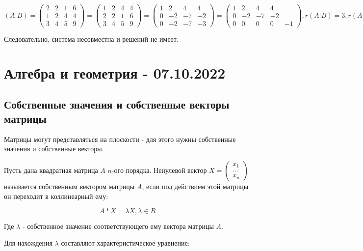 \documentclass{article}
\begin{document}
$(A|B) = \begin{pmatrix}
    2 & 2 & 1 & 6 \\
    1 & 2 & 4 & 4 \\
    3 & 4 & 5 & 9
\end{pmatrix} = \begin{pmatrix}
    1 & 2 & 4 & 4 \\
    2 & 2 & 1 & 6 \\
    3 & 4 & 5 & 9
\end{pmatrix} = \begin{pmatrix}
    1 & 2 & 4 & 4 \\
    0 & -2 & -7 & -2 \\
    0 & -2 & -7 & -3
\end{pmatrix} = \begin{pmatrix}
    1 & 2 & 4 & 4 \\
    0 & -2 & -7 & -2 \\
    0 & 0 & 0 & 0 & -1
\end{pmatrix}, r(A|B) = 3, r(A) = 2$

Следовательно, система несовместна и решений не имеет.

\pagebreak
\section{Алгебра и геометрия - 07.10.2022}

\subsection{Собственные значения и собственные векторы матрицы}

Матрицы могут представляться на плоскости - для этого нужны собственные значения и собственные векторы.

Пусть дана квадратная матрица $A$ $n$-ого порядка. Ненулевой вектор $X = \begin{pmatrix}
    x_1 \\
    ... \\
    x_n
\end{pmatrix}$ называется собственным вектором матрицы $A$, если под действием этой матрицы он переходит в коллинеарный ему:

$$
A * X = \lambda X, \lambda \in R
$$

Где $\lambda$ - собственное значение соответствующего ему вектора матрицы $A$.

Для нахождения $\lambda$ составляют характеристическое уравнение:
\end{document}
